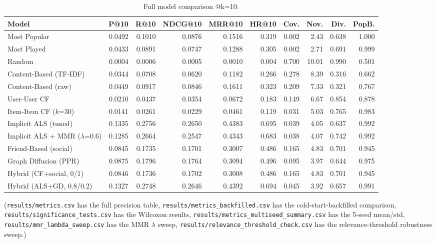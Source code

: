 \documentclass[11pt,a4paper]{article}
\newcommand{\code}[1]{\texttt{#1}}
\begin{document}
\begin{table}[!htbp]
\centering
\scriptsize
\setlength{\tabcolsep}{4pt}
\begin{tabular}{lrrrrrrrrr}
\toprule
Model & P@10 & R@10 & NDCG@10 & MRR@10 & HR@10 & Cov. & Nov. & Div. & PopB. \\
\midrule
Most Popular & 0.0492 & 0.1010 & 0.0876 & 0.1516 & 0.319 & 0.002 & 2.43 & 0.638 & 1.000 \\
Most Played & 0.0433 & 0.0891 & 0.0747 & 0.1288 & 0.305 & 0.002 & 2.71 & 0.691 & 0.999 \\
Random & 0.0004 & 0.0006 & 0.0005 & 0.0010 & 0.004 & 0.700 & 10.01 & 0.990 & 0.501 \\
Content-Based (TF-IDF) & 0.0344 & 0.0708 & 0.0620 & 0.1182 & 0.266 & 0.278 & 8.39 & 0.316 & 0.662 \\
Content-Based (raw) & 0.0449 & 0.0917 & 0.0846 & 0.1611 & 0.323 & 0.209 & 7.33 & 0.321 & 0.767 \\
User-User CF & 0.0210 & 0.0437 & 0.0354 & 0.0672 & 0.183 & 0.149 & 6.67 & 0.854 & 0.878 \\
Item-Item CF ($k$=30) & 0.0141 & 0.0261 & 0.0229 & 0.0461 & 0.119 & 0.031 & 5.03 & 0.765 & 0.983 \\
Implicit ALS (tuned) & 0.1335 & 0.2756 & 0.2650 & 0.4383 & 0.695 & 0.039 & 4.05 & 0.637 & 0.992 \\
Implicit ALS + MMR ($\lambda$=0.6) & 0.1285 & 0.2664 & 0.2547 & 0.4343 & 0.683 & 0.038 & 4.07 & 0.742 & 0.992 \\
Friend-Based (social) & 0.0845 & 0.1735 & 0.1701 & 0.3007 & 0.486 & 0.165 & 4.83 & 0.701 & 0.945 \\
Graph Diffusion (PPR) & 0.0875 & 0.1796 & 0.1764 & 0.3094 & 0.496 & 0.095 & 3.97 & 0.644 & 0.975 \\
Hybrid (CF+social, 0/1) & 0.0846 & 0.1736 & 0.1702 & 0.3008 & 0.486 & 0.165 & 4.83 & 0.701 & 0.945 \\
Hybrid (ALS+GD, 0.8/0.2) & 0.1327 & 0.2748 & 0.2646 & 0.4392 & 0.694 & 0.045 & 3.92 & 0.657 & 0.991 \\
\bottomrule
\end{tabular}
\caption{Full model comparison @k=10.}
\label{tab:results}
\end{table}

(\code{results/metrics.csv} has the full precision table, \code{results/metrics\_backfilled.csv} has the cold-start-backfilled comparison, \code{results/significance\_tests.csv} has the Wilcoxon results, \code{results/metrics\_multiseed\_summary.csv} has the 5-seed mean/std, \code{results/mmr\_lambda\_sweep.csv} has the MMR $\lambda$ sweep, \code{results/relevance\_threshold\_check.csv} has the relevance-threshold robustness sweep.)
\end{document}
